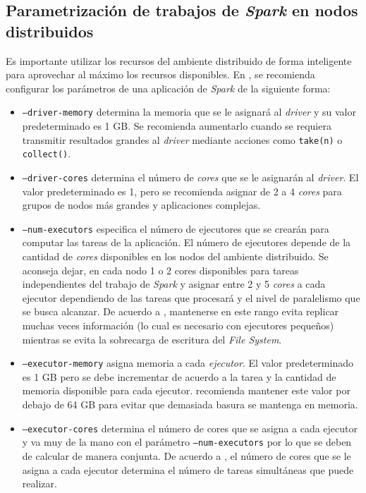 \subsection{Parametrización de trabajos de \textit{Spark} en nodos distribuidos}
\label{section:parametrizacion_de_trabajos_spark}

Es importante utilizar los recursos del ambiente distribuido de forma inteligente para aprovechar al máximo los recursos disponibles. En \cite{sparkconfuds}, se recomienda configurar los parámetros de una aplicación de \textit{Spark} de la siguiente forma:

\begin{itemize}
	\item \texttt{--driver-memory} determina la memoria que se le asignará al \textit{driver} y su valor predeterminado es 1 GB. Se recomienda aumentarlo cuando se requiera transmitir resultados grandes al \textit{driver} mediante acciones como \texttt{take(n)} o \texttt{collect()}.
	\item \texttt{--driver-cores} determina el número de \textit{cores} que se le asignarán al \textit{driver}. El valor predeterminado es 1, pero se recomienda asignar de 2 a 4 \textit{cores} para grupos de nodos más grandes y aplicaciones complejas. 
	\item \texttt{--num-executors} especifica el número de ejecutores que se crearán para computar las tareas de la aplicación. El número de ejecutores depende de la cantidad de \textit{cores} disponibles en los nodos del ambiente distribuido. Se aconseja dejar, en cada nodo 1 o 2 cores disponibles para tareas independientes del trabajo de \textit{Spark} y asignar entre 2 y 5 \textit{cores} a cada ejecutor dependiendo de las tareas que procesará y el nivel de paralelismo que se busca alcanzar. De acuerdo a \cite{sparkconfcloudera}, mantenerse en este rango evita replicar muchas veces información (lo cual es necesario con ejecutores pequeños) mientras se evita la sobrecarga de escritura del \textit{File System}.
	\item \texttt{--executor-memory} asigna memoria a cada \textit{ejecutor}. El valor predeterminado es 1 GB pero se debe incrementar de acuerdo a la tarea y la cantidad de memoria disponible para cada ejecutor. \cite{sparkconfcloudera} recomienda mantener este valor por debajo de 64 GB para evitar que demasiada basura se mantenga en memoria.
	\item \texttt{--executor-cores} determina el número de cores que se asigna a cada ejecutor y va muy de la mano con el parámetro \texttt{--num-executors} por lo que se deben de calcular de manera conjunta. De acuerdo a \cite{sparkconfcloudera}, el número de cores que se le asigna a cada ejecutor determina el número de tareas simultáneas que puede realizar.
\end{itemize}

